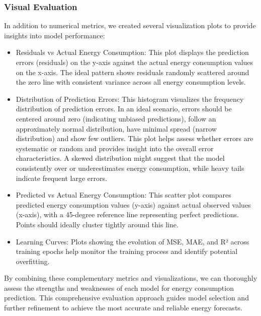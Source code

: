 \subsubsection{Visual Evaluation}

In addition to numerical metrics, we created several visualization plots to provide insights into model performance:

\begin{itemize}
    \item Residuals vs Actual Energy Consumption: This plot displays the prediction errors (residuals) on the y-axis against the actual energy consumption values on the x-axis. The ideal pattern shows residuals randomly scattered around the zero line with consistent variance across all energy consumption levels.
    \item Distribution of Prediction Errors: This histogram visualizes the frequency distribution of prediction errors. In an ideal scenario, errors should be centered around zero (indicating unbiased predictions), follow an approximately normal distribution, have minimal spread (narrow distribution) and show few outliers. This plot helps assess whether errors are systematic or random and provides insight into the overall error characteristics. A skewed distribution might suggest that the model consistently over or underestimates energy consumption, while heavy tails indicate frequent large errors.
    \item Predicted vs Actual Energy Consumption: This scatter plot compares predicted energy consumption values (y-axis) against actual observed values (x-axis), with a 45-degree reference line representing perfect predictions. Points should ideally cluster tightly around this line.
    \item Learning Curves:  Plots showing the evolution of MSE, MAE, and R² across training epochs help monitor the training process and identify potential overfitting.
\end{itemize}

By combining these complementary metrics and visualizations, we can thoroughly assess the strengths and weaknesses of each model for energy consumption prediction. This comprehensive evaluation approach guides model selection and further refinement to achieve the most accurate and reliable energy forecasts.